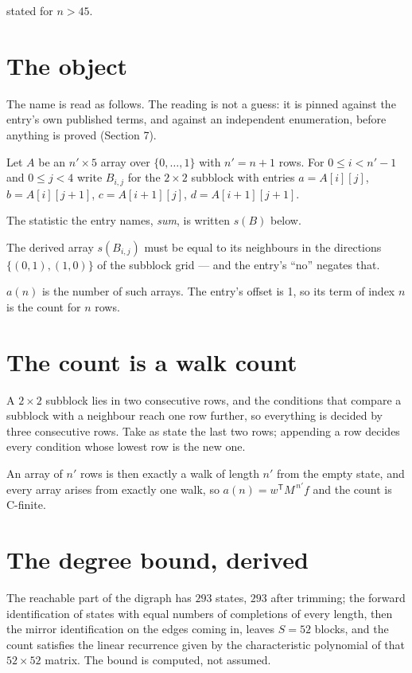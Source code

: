 \documentclass[11pt]{article}
\theoremstyle{definition}
\begin{document}
stated for $n > 45$.

\section{The object}

The name is read as follows. The reading is not a guess: it is pinned against the entry's own published terms, and against an independent enumeration, before anything is proved (Section 7).

Let $A$ be an $n' \times 5$ array over $\{0,\dots,1\}$ with $n' = n + 1$ rows. For $0 \le i < n'-1$ and $0 \le j < 4$ write $B_{i,j}$ for the $2\times2$ subblock with entries $a = A[i][j]$, $b = A[i][j{+}1]$, $c = A[i{+}1][j]$, $d = A[i{+}1][j{+}1]$.

The statistic the entry names, {\itshape sum}, is written $s(B)$ below.

The derived array $s(B_{i,j})$ must be equal to its neighbours in the directions $\{(0,1), (1,0)\}$ of the subblock grid --- and the entry's ``no'' negates that.

$a(n)$ is the number of such arrays. The entry's offset is 1, so its term of index $n$ is the count for $n$ rows.

\section{The count is a walk count}

A $2\times2$ subblock lies in two consecutive rows, and the conditions that compare a subblock with a neighbour reach one row further, so everything is decided by three consecutive rows. Take as state the last two rows; appending a row decides every condition whose lowest row is the new one.

An array of $n'$ rows is then exactly a walk of length $n'$ from the empty state, and every array arises from exactly one walk, so $a(n) = w^{\mathsf T}M^{\,n'}f$ and the count is C-finite.

\section{The degree bound, derived}

The reachable part of the digraph has $293$ states, $293$ after trimming; the forward identification of states with equal numbers of completions of every length, then the mirror identification on the edges coming in, leaves $S = 52$ blocks, and the count satisfies the linear recurrence given by the characteristic polynomial of that $52\times52$ matrix. The bound is computed, not assumed.
\end{document}
